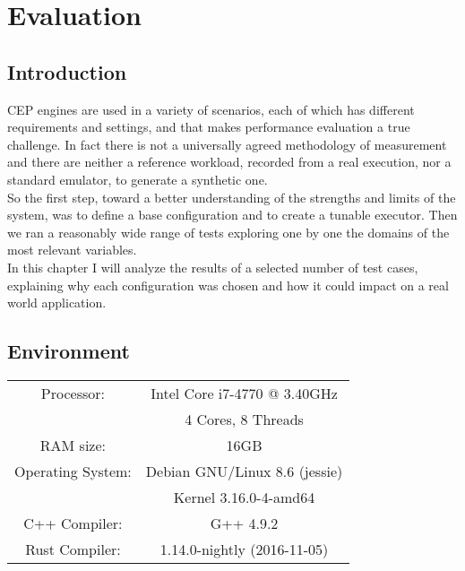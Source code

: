 \chapter{Evaluation}

\section{Introduction}
CEP engines are used in a variety of scenarios, each of which has different requirements and settings, and that makes performance evaluation a true challenge. In fact there is not a universally agreed methodology of measurement and there are neither a reference workload, recorded from a real execution, nor a standard emulator, to generate a synthetic one.\\
So the first step, toward a better understanding of the strengths and limits of the system, was to define a base configuration and to create a tunable executor. Then we ran a reasonably wide range of tests exploring one by one the domains of the most relevant variables.\\
In this chapter I will analyze the results of a selected number of test cases, explaining why each configuration was chosen and how it could impact on a real world application.

\section{Environment}
\begin{table}[h]
  \begin{center}
    \begin{tabular}{|c|c|}
      \hline
      Processor: 		& Intel Core i7-4770 @ 3.40GHz\\
                        & 4 Cores, 8 Threads\\ 
      \hline
      RAM size: 		& 16GB\\
      \hline
      Operating System: & Debian GNU/Linux 8.6 (jessie)\\
                        & Kernel 3.16.0-4-amd64\\
      \hline
      C++ Compiler:     & G++ 4.9.2\\
      \hline
      Rust Compiler:    & 1.14.0-nightly (2016-11-05)\\
      \hline
    \end{tabular}
  \end{center}
\end{table}


